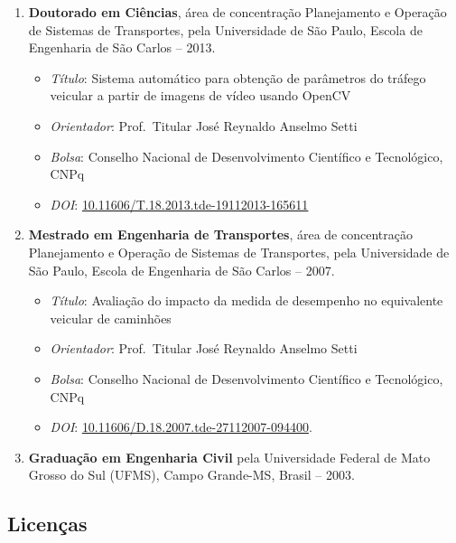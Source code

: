 \documentclass[
  brazilian,
  11pt,
  a4paper,
]{article}
\providecommand{\tightlist}{%
  \setlength{\itemsep}{0pt}\setlength{\parskip}{0pt}}
\begin{document}
\begin{enumerate}
\def\labelenumi{\arabic{enumi}.}
\tightlist
\item
  \textbf{Doutorado em Ciências}, área de concentração Planejamento e
  Operação de Sistemas de Transportes, pela Universidade de São Paulo,
  Escola de Engenharia de São Carlos -- 2013.

  \begin{itemize}
  \tightlist
  \item
    \emph{Título}: Sistema automático para obtenção de parâmetros do
    tráfego veicular a partir de imagens de vídeo usando OpenCV
  \item
    \emph{Orientador}: Prof.~Titular José Reynaldo Anselmo Setti
  \item
    \emph{Bolsa}: Conselho Nacional de Desenvolvimento Científico e
    Tecnológico, CNPq
  \item
    \emph{DOI}:
    \href{https://doi.org/10.11606/T.18.2013.tde-19112013-165611}{10.11606/T.18.2013.tde-19112013-165611}
  \end{itemize}
\item
  \textbf{Mestrado em Engenharia de Transportes}, área de concentração
  Planejamento e Operação de Sistemas de Transportes, pela Universidade
  de São Paulo, Escola de Engenharia de São Carlos -- 2007.

  \begin{itemize}
  \tightlist
  \item
    \emph{Título}: Avaliação do impacto da medida de desempenho no
    equivalente veicular de caminhões
  \item
    \emph{Orientador}: Prof.~Titular José Reynaldo Anselmo Setti
  \item
    \emph{Bolsa}: Conselho Nacional de Desenvolvimento Científico e
    Tecnológico, CNPq
  \item
    \emph{DOI}:
    \href{https://doi.org/10.11606/D.18.2007.tde-27112007-094400}{10.11606/D.18.2007.tde-27112007-094400}.
  \end{itemize}
\item
  \textbf{Graduação em Engenharia Civil} pela Universidade Federal de
  Mato Grosso do Sul (UFMS), Campo Grande-MS, Brasil -- 2003.
\end{enumerate}

\subsection{Licenças}\label{licenuxe7as}
\end{document}
